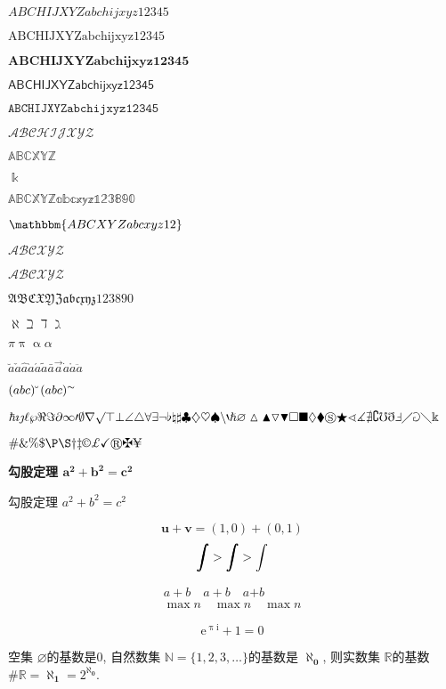 \documentclass{ctexart}
\begin{document}
$\mathit{ABCHIJXYZabchijxyz12345}$

$\mathrm{ABCHIJXYZabchijxyz12345}$

$\mathbf{ABCHIJXYZabchijxyz12345}$

$\mathsf{ABCHIJXYZabchijxyz12345}$

$\mathtt{ABCHIJXYZabchijxyz12345}$

$\mathcal{ABCHIJXYZ}$

$\mathbb{ABCXYZ}$

$\Bbbk$

$\mathbb{ABCXYZabcxyz123890}$

$\mathbbm{ABCXYZabcxyz12}$

$\mathscr{ABCXYZ}$

$\mathcal{ABCXYZ}$

$\mathfrak{ABCXYZabcxyz123890}$

$\aleph\beth\daleth\gimel$

$\pi\uppi\upalpha\alpha$

$\breve{a}\check{a}\hat{a}\grave{a}\acute{a}\tilde{a}\bar{a}\vec{a}\dot{a}\mathring{a}\ddot{a}$

$(abc)\spbreve(abc)\sptilde$

$\hbar\imath\jmath\ell\wp\Re\Im\partial\infty\prime\emptyset\nabla\surd\top\bot\angle\triangle\forall\exists\neg\flat\natural\sharp\clubsuit\diamondsuit\heartsuit\spadesuit
\backslash\backprime\hslash\varnothing\vartriangle\blacktriangle\triangledown\blacktriangledown\square\blacksquare\lozenge\blacklozenge\circledS\bigstar
\sphericalangle\measuredangle\nexists\complement\mho\eth\Finv\diagup\Game\diagdown\Bbbk$

$\# \& \% \$ \P \S \dag \ddag \copyright \pounds \checkmark \circledR \maltese \yen$

\textbf{勾股定理 $\bm{a^2+b^2=c^2}$}

勾股定理 $a^2+b^2=c^2$

\[ \bm u + \bm v = (1,0) + (0,1) \]
\[ \hm\int > \bm\int > \int \]

\begin{gather*}
a+b \quad a{+}b \quad a\mathord{+}b \\
\max n \quad {\max} n \quad \mathord{\max} n
\end{gather*}

\[ \mathrm{e}^{\uppi\mathrm{i}} + 1 = 0 \]

空集 $\varnothing$的基数是$0$, 自然数集 $\mathbb{N}= \{1,2,3,\ldots\}$的基数是 $\bm{\aleph_0}$, 则实数集 $\mathbb{R}$的基数 $\#\mathbb{R} = \bm{\aleph_1} = 2^{\bm{\aleph_0}}$.
\end{document}
